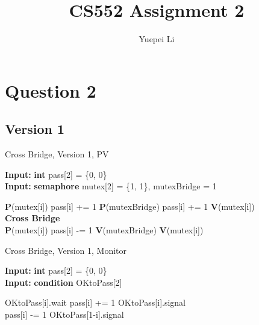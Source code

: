 \documentclass{article}
\title{CS552 Assignment 2}
\author{Yuepei Li}
\renewcommand{\algorithmicrequire}{\textbf{Input: }}
\begin{document}
\maketitle


\section{Question 2}

\subsection{Version 1}

\begin{algorithm}[H]
  \caption{Cross Bridge, Version 1, PV}
  \algorithmicrequire \textbf{int} pass[2] = \{0, 0\} \\
  \algorithmicrequire \textbf{semaphore} mutex[2] = \{1, 1\}, mutexBridge = 1
  \begin{algorithmic}
      \State \textbf{P}(mutex[i])
        \State pass[i] += 1
        \State \textbf{P}(mutexBridge)
      \Else
        \State pass[i] += 1
      \EndIf
      \State \textbf{V}(mutex[i])
      \\
      \State \textbf{Cross Bridge}
      \\
      \State \textbf{P}(mutex[i])
      \State pass[i] -= 1
        \State \textbf{V}(mutexBridge)
      \EndIf
      \State \textbf{V}(mutex[i])
    \EndProcedure
  \end{algorithmic}
\end{algorithm}

\begin{algorithm}[H]
  \caption{Cross Bridge, Version 1, Monitor}
  \algorithmicrequire \textbf{int} pass[2] = \{0, 0\} \\
  \algorithmicrequire \textbf{condition} OKtoPass[2] \\

  \begin{algorithmic}
        \State OKtoPass[i].wait
      \EndIf
      \State pass[i] += 1
      \State OKtoPass[i].signal
    \EndProcedure
    \\
      \State pass[i] -= 1
        \State OKtoPass[1-i].signal
      \EndIf
    \EndProcedure
  \end{algorithmic}
\end{algorithm}
\end{document}
